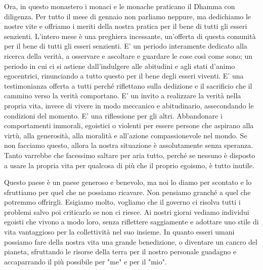 Ora, in questo monastero i monaci e le monache praticano il Dhamma con
diligenza. Per tutto il mese di gennaio non parliamo neppure, ma
dedichiamo le nostre vite e offriamo i meriti della nostra pratica per
il bene di tutti gli esseri senzienti. L'intero mese è una preghiera
incessante, un'offerta di questa comunità per il bene di tutti gli
esseri senzienti. E' un periodo interamente dedicato alla ricerca della
verità, a osservare e ascoltare e guardare le cose così come sono; un
periodo in cui ci si astiene dall'indulgere alle abitudini e agli stati
d'animo egocentrici, rinunciando a tutto questo per il bene degli esseri
viventi. E' una testimonianza offerta a tutti perché riflettano sulla
dedizione e il sacrificio che il cammino verso la verità comportano. E'
un invito a realizzare la verità nella propria vita, invece di vivere in
modo meccanico e abitudinario, assecondando le condizioni del momento.
E' una riflessione per gli altri. Abbandonare i comportamenti immorali,
egoistici o violenti per essere persone che aspirano alla virtù, alla
generosità, alla moralità e all'azione compassionevole nel mondo. Se non
facciamo questo, allora la nostra situazione è assolutamente senza
speranza. Tanto varrebbe che facessimo saltare per aria tutto, perché se
nessuno è disposto a usare la propria vita per qualcosa di più che il
proprio egoismo, è tutto inutile.

Questo paese è un paese generoso e benevolo, ma noi lo diamo per
scontato e lo sfruttiamo per quel che ne possiamo ricavare. Non pensiamo
granché a quel che potremmo offrirgli. Esigiamo molto, vogliamo che il
governo ci risolva tutti i problemi salvo poi criticarlo se non ci
riesce. Ai nostri giorni vediamo individui egoisti che vivono a modo
loro, senza riflettere saggiamente e adottare uno stile di vita
vantaggioso per la collettività nel suo insieme. In quanto esseri umani
possiamo fare della nostra vita una grande benedizione, o diventare un
cancro del pianeta, sfruttando le risorse della terra per il nostro
personale guadagno e accaparrando il più possibile per "me" e per il
"mio".

